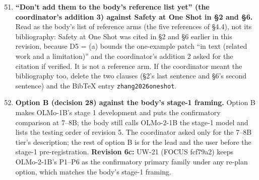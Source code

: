 \documentclass{article}
\theoremstyle{plain}
\theoremstyle{definition}
\theoremstyle{remark}
\begin{document}
\begin{enumerate}
  \setcounter{enumi}{50}
  \item \textbf{``Don't add them to the body's reference list yet'' (the
        coordinator's addition 3) against Safety at One Shot in \S{}2 and
        \S{}6.} Read as the body's list of reference arms (the five references
        of \S{}4.4), not its bibliography: Safety at One Shot was cited in \S{}2
        and \S{}6 earlier in this revision, because D5 = (a) bounds the
        one-example patch ``in text (related work and a limitation)'' and the
        coordinator's addition 2 asked for the citation if verified. It is not a
        reference arm. If the coordinator meant the bibliography too, delete the
        two clauses (\S{}2's last sentence and \S{}6's second sentence) and the
        BibTeX entry \texttt{zhang2026oneshot}.
  \item \textbf{Option B (decision 28) against the body's stage-1 framing.}
        Option B makes OLMo-1B's stage 1 development and puts the confirmatory
        comparison at 7--8B; the body still calls OLMo-2-1B the stage-1 model
        and lists the testing order of revision 5. The coordinator asked only
        for the 7--8B tier's description; the rest of option B is for the lead
        and the user before the stage-1 pre-registration. \textbf{Revision 6c:}
        UW-21 (FOCUS fcf79a2) keeps OLMo-2-1B's P1--P6 as the confirmatory
        primary family under any re-plan option, which matches the body's
        stage-1 framing.
\end{enumerate}
\end{document}
